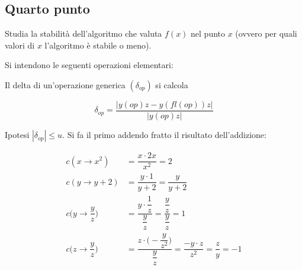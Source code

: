 \subsection{Quarto punto} Studia la stabilità dell'algoritmo che valuta $f(x)$ nel punto $x$ (ovvero per quali valori di $x$ l'al\-go\-rit\-mo è stabile o meno).\medskip

Si intendono le seguenti operazioni elementari:

\begin{center}
\end{center}

Il delta di un'operazione generica $(\delta_{op})$ si calcola

\begin{equation*}
  \delta_{op} = \dfrac{|y(op)z - y(fl(op))z|}{|y(op)z|}
\end{equation*}

Ipotesi $|\delta_{op}|\leq u$. Si fa il primo addendo fratto il risultato dell'addizione:

\begin{equation*}
\begin{split}
  c(x\rightarrow x^2) &= \dfrac{x\cdot 2x}{x^2} = 2\\[1.5ex]
  c(y\rightarrow y+2) &= \dfrac{y\cdot 1}{y+2} = \dfrac{y}{y+2}\\[1.5ex]
  c\Big(y\rightarrow \dfrac{y}{z}\Big) &= \dfrac{y\cdot \dfrac{1}{z}}{\dfrac{y}{z}} = \dfrac{\dfrac{y}{z}}{\dfrac{y}{z}} = 1\\[1.5ex]
  c\Big(z\rightarrow \dfrac{y}{z}\Big) &= \dfrac{z\cdot \Big(-\dfrac{y}{z^2}\Big)}{\dfrac{y}{z}} = \dfrac{-y\cdot z}{z^2} = \dfrac{z}{y} = -1
\end{split}
\end{equation*}

